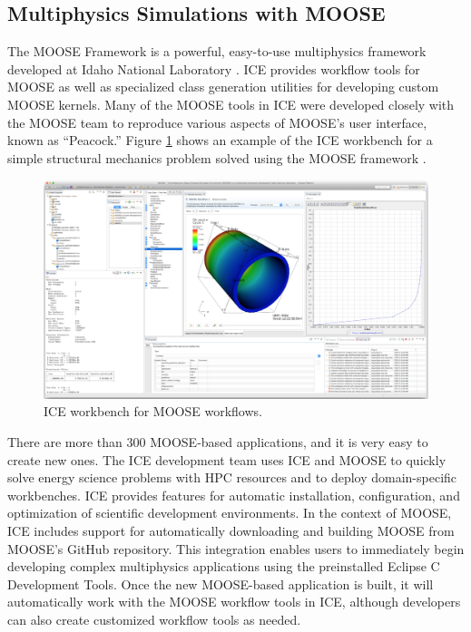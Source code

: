 \subsection{Multiphysics Simulations with
MOOSE}\label{multiphysics-simulations-with-moose}

The MOOSE Framework is a powerful, easy-to-use multiphysics framework
developed at Idaho National Laboratory \cite{gaston_moose:_2009}. ICE
provides workflow tools for MOOSE as well as specialized class
generation utilities for developing custom MOOSE kernels. Many of the
MOOSE tools in ICE were developed closely with the MOOSE team to
reproduce various aspects of MOOSE's user interface, known as ``Peacock.'' 
Figure \ref{moose} shows an example of the ICE workbench for a simple structural mechanics
problem solved using the MOOSE framework \cite{mccaskey_scientific_2015}.

\begin{figure}[htbp]
\centering
\includegraphics[width=\textwidth]{images/ice-moose.png}
\caption{ICE workbench for MOOSE workflows.}
\label{moose}
\end{figure}

There are more than 300 MOOSE-based applications, and it is very
easy to create new ones. The ICE development team uses ICE
and MOOSE to quickly solve energy science problems with HPC resources 
and to deploy domain-specific workbenches. ICE provides features for automatic installation, configuration, and optimization of scientific development environments. In the context of MOOSE, ICE includes support for automatically downloading and building MOOSE from MOOSE's GitHub
repository. This integration enables users to immediately begin developing
complex multiphysics applications using the preinstalled Eclipse C Development 
Tools. Once the new MOOSE-based application is built, it will automatically work with
the MOOSE workflow tools in ICE, although developers can also create
customized workflow tools as needed.

